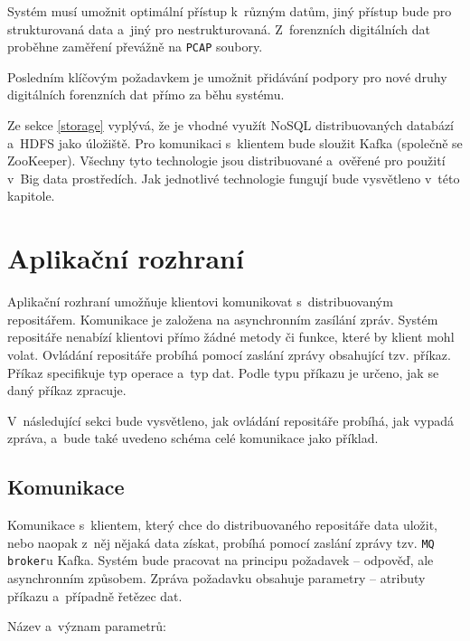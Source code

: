 Systém musí umožnit optimální přístup k~různým datům, jiný přístup bude pro strukturovaná data a~jiný pro nestrukturovaná. Z~forenzních digitálních dat proběhne zaměření převážně na \texttt{PCAP} soubory.

Posledním klíčovým požadavkem je umožnit přidávání podpory pro nové druhy digitálních forenzních dat přímo za běhu systému.

Ze sekce \ref{storage} vyplývá, že je vhodné využít NoSQL distribuovaných databází a~HDFS jako úložiště. Pro komunikaci s~klientem bude sloužit Kafka (společně se ZooKeeper). Všechny tyto technologie jsou distribuované a~ověřené pro použití v~Big data prostředích. Jak jednotlivé technologie fungují bude vysvětleno v~této kapitole.

\section{Aplikační rozhraní}
Aplikační rozhraní umožňuje klientovi komunikovat s~distribuovaným repositářem. Komunikace je založena na asynchronním zasílání zpráv. Systém repositáře nenabízí klientovi přímo žádné metody či funkce, které by klient mohl volat. Ovládání repositáře probíhá pomocí zaslání zprávy obsahující tzv. příkaz. Příkaz specifikuje typ operace a~typ dat. Podle typu příkazu je určeno, jak se daný příkaz zpracuje.

V~následující sekci bude vysvětleno, jak ovládání repositáře probíhá, jak vypadá zpráva, a~bude také uvedeno schéma celé komunikace jako příklad.

\subsection{Komunikace} \label{designCommunication}
Komunikace s~klientem, který chce do distribuovaného repositáře data uložit, nebo naopak z~něj nějaká data získat, probíhá pomocí zaslání zprávy tzv. \texttt{MQ broker}u Kafka. Systém bude pracovat na principu požadavek -- odpověď, ale asynchronním způsobem. Zpráva požadavku obsahuje parametry -- atributy příkazu a~případně řetězec dat.

\vspace{0.5cm}
\noindent Název a~význam parametrů:

